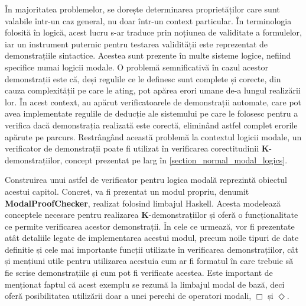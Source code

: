 \documentclass[12pt, openany]{book}
\newcommand{\mysectionreference}[1]{\autoref{#1}}
\begin{document}
            \par{}
                În majoritatea problemelor, se dorește determinarea proprietăților care sunt valabile într-un caz 
                general, nu doar într-un context particular. În terminologia folosită în logică, acest lucru s-ar 
                traduce prin noțiunea de validitate a formulelor, iar un instrument puternic pentru testarea validității
                este reprezentat de demonstrațiile sintactice. Acestea sunt prezente în multe sisteme logice, nefiind 
                specifice numai logicii modale. O problemă semnificativă în cazul acestor demonstrații este că, deși 
                regulile ce le definesc sunt complete și corecte, din cauza complexității pe care le ating, pot apărea 
                erori umane de-a lungul realizării lor. În acest context, au apărut verificatoarele de demonstrații 
                automate, care pot avea implementate regulile de deducție ale sistemului pe care le folosesc pentru a 
                verifica dacă demonstrația realizată este corectă, eliminând astfel complet erorile apărute pe parcurs. 
                Restrângând această problemă la contextul logicii modale, un verificator de demonstrații poate fi 
                utilizat în verificarea corectitudinii \textbf{K}-demonstrațiilor, concept prezentat pe larg în 
                \mysectionreference{section_normal_modal_logics}. 
                
            \par{}
                Construirea unui astfel de verificator pentru logica modală reprezintă obiectul acestui capitol. 
                Concret, va fi prezentat un modul propriu, denumit \textbf{ModalProofChecker}, realizat folosind limbajul Haskell. 
                Acesta modelează conceptele necesare pentru realizarea 
                \textbf{K}-demonstrațiilor și oferă o funcționalitate ce permite verificarea acestor demonstrații. În 
                cele ce urmează, vor fi prezentate atât detaliile legate de implementarea acestui modul, precum noile 
                tipuri de date definitie și cele mai importante funcții utilizate în verificarea demonstrațiilor, cât și 
                mențiuni utile pentru utilizarea acestuia cum ar fi formatul în care trebuie să fie scrise 
                demonstrațiile și cum pot fi verificate acestea. Este important de menționat faptul că acest exemplu se 
                rezumă la limbajul modal de bază, deci oferă posibilitatea utilizării doar a unei perechi de operatori
                modali, $\Box$ și $\Diamond$.
\end{document}
